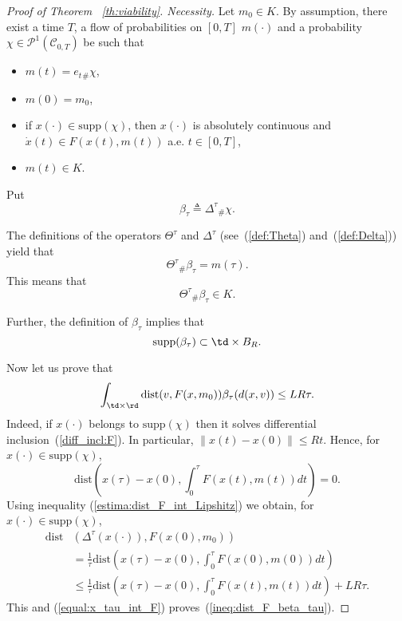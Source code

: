 \documentclass[12pt]{article}
\newcommand{\pc}[2]{\mathcal{P}^1(\mathcal{C}_{{#1},{#2}})}
\begin{document}
\begin{proof}[Proof of Theorem  ~\ref{th:viability}. Necessity]
Let $m_0\in K$. By assumption, there exist a time $T$, a flow of probabilities on $[0,T]$ $m(\cdot)$ and a probability $\chi\in\pc{0}{T}$ be such that 
\begin{itemize}
	\item $m(t)=e_t{}_\#\chi$,
	\item $m(0)=m_0$,
	\item if $x(\cdot)\in\mathrm{supp}(\chi)$, then $x(\cdot)$ is absolutely continuous and $\dot{x}(t)\in F(x(t),m(t))$ a.e. $t\in [0,T]$,
	\item $m(t)\in K$.
\end{itemize} 

Put $$%
\beta_\tau\triangleq \Delta^\tau{}_\#\chi.
$$%

The definitions of the operators $\Theta^\tau$ and $\Delta^\tau$ (see~(\ref{def:Theta}) and~(\ref{def:Delta})) yield that
$$\Theta^\tau{}_\#\beta_\tau=m(\tau). $$ This means that
\begin{equation}\label{incl:beta_tau_K}
\Theta^\tau{}_\#\beta_\tau\in K.
\end{equation}

Further, the definition of $\beta_\tau$ implies that
\begin{equation}\label{incl:supp_beta_tau}
\mathrm{supp}(\beta_\tau)\subset \td\times B_R.
\end{equation}

Now let us prove that 
\begin{equation}\label{ineq:dist_F_beta_tau}
\int_{\td\times\rd}\mathrm{dist}(v,F(x,m_0))\beta_\tau(d(x,v))\leq LR \tau.
\end{equation}
Indeed, if $x(\cdot)$ belongs to $\mathrm{supp}(\chi)$ then it solves differential inclusion~(\ref{diff_incl:F}). In particular, $\|x(t)-x(0)\|\leq Rt$. Hence, for  $x(\cdot)\in\mathrm{supp}(\chi)$,
\begin{equation}\label{equal:x_tau_int_F}
\mathrm{dist}\left(x(\tau)-x(0),\int_0^\tau F(x(t),m(t))dt\right)=0.
\end{equation}
Using inequality (\ref{estima:dist_F_int_Lipshitz}) we obtain, for $x(\cdot)\in\mathrm{supp}(\chi)$,
\begin{equation*}\begin{split}\mathrm{dist}&(\Delta^\tau(x(\cdot)),F(x(0),m_0) )\\&=\frac{1}{\tau}\mathrm{dist}\left(x(\tau)-x(0),\int_0^\tau F(x(0),m(0))dt \right)\\&\leq \frac{1}{\tau}\mathrm{dist}\left(x(\tau)-x(0),\int_0^\tau F(x(t),m(t))dt \right)+LR\tau.\end{split}\end{equation*}
This  and (\ref{equal:x_tau_int_F}) proves~(\ref{ineq:dist_F_beta_tau}).


\end{proof}
\end{document}
